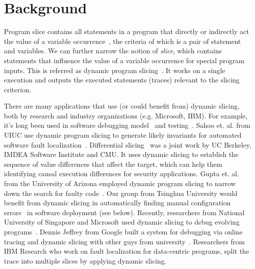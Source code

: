 \documentclass[DIV=calc, paper=a4, fontsize=11pt, twocolumn]{scrartcl}
\begin{document}

\section*{Background}
Program slice contains all statements in a program that directly or indirectly act the value of a variable occurrence~\cite{weiser},
the criteria of which is a pair of statement and variables.
We can further narrow the notion of \emph{slice},
which contains statements that influence the value of a variable occurrence for special program inputs.
This is referred as dynamic program slicing~\cite{agrawal1990dynamic}.
It works on a single execution and outputs the executed statements (traces) relevant to the slicing criterion.

There are many applications that use (or could benefit from) dynamic slicing, both by research and industry organizations (e.g. Microsoft, IBM).
For example, it's long been used in software debugging model~\cite{1993debugging,1999efficient} and testing~\cite{1993incremental}.
Sahoo et. al. from UIUC use dynamic program slicing to generate likely invariants for automated software fault localization~\cite{sahoo2013asplos}.
Differential slicing~\cite{johnson2011differential} was a joint work by UC Berkeley, IMDEA Software Institute and CMU.
It uses dynamic slicing to establish the sequence of value differences that affect the target,
which can help them identifying causal execution differences for security applications.
Gupta et. al. from the University of Arizona employed dynamic program slicing to narrow down the search for faulty code~\cite{Gupta}.
Our group from Tsinghua University would benefit from dynamic slicing in automatically finding manual configuration errors~\cite{yin2011empirical} in software deployment (see below).
Recently, researchers from National University of Singapore and Microsoft used dynamic slicing to debug evolving programs~\cite{Qi}.
Dennis Jeffrey from Google built a system for debugging via online tracing and dynamic slicing with other guys from university~\cite{google}.
Researchers from IBM Research\cite{ibm} who work on fault localization for data-centric programs,
split the trace into multiple slices by applying dynamic slicing.
\end{document}

